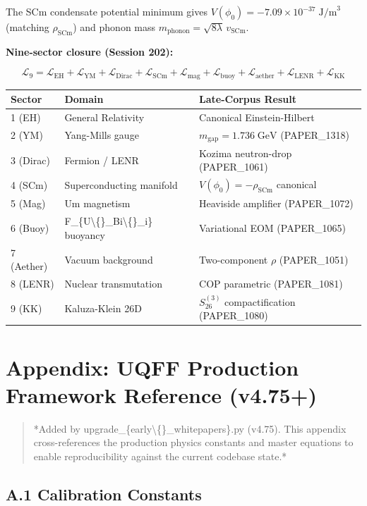 \documentclass[11pt]{article}
\begin{document}
The SCm condensate potential minimum gives $V(\phi_0) = -7.09 \times 10^{-37}\;\text{J/m}^3$ (matching $\rho_{\text{SCm}}$) and phonon mass $m_{\text{phonon}} = \sqrt{8\lambda}\,v_{\text{SCm}}$.

\textbf{Nine-sector closure (Session 202):}

$$\mathcal{L}_{9} = \mathcal{L}_{\text{EH}} + \mathcal{L}_{\text{YM}} + \mathcal{L}_{\text{Dirac}} + \mathcal{L}_{\text{SCm}} + \mathcal{L}_{\text{mag}} + \mathcal{L}_{\text{buoy}} + \mathcal{L}_{\text{aether}} + \mathcal{L}_{\text{LENR}} + \mathcal{L}_{\text{KK}}$$

\begin{center}
\begin{longtable}{lll}
\toprule
Sector & Domain & Late-Corpus Result \tabularnewline
\midrule
\endhead
1 (EH) & General Relativity & Canonical Einstein-Hilbert \tabularnewline
2 (YM) & Yang-Mills gauge & $m_{\text{gap}} = 1.736\;\text{GeV}$ (PAPER\_1318) \tabularnewline
3 (Dirac) & Fermion / LENR & Kozima neutron-drop (PAPER\_1061) \tabularnewline
4 (SCm) & Superconducting manifold & $V(\phi_0) = -\rho_{\text{SCm}}$ canonical \tabularnewline
5 (Mag) & Um magnetism & Heaviside amplifier (PAPER\_1072) \tabularnewline
6 (Buoy) & F\_\{U\textbackslash\{\}\_Bi\textbackslash\{\}\_i\} buoyancy & Variational EOM (PAPER\_1065) \tabularnewline
7 (Aether) & Vacuum background & Two-component $\rho$ (PAPER\_1051) \tabularnewline
8 (LENR) & Nuclear transmutation & COP parametric (PAPER\_1081) \tabularnewline
9 (KK) & Kaluza-Klein 26D & $S_{26}^{(3)}$ compactification (PAPER\_1080) \tabularnewline
\bottomrule
\end{longtable}
\end{center}

\section*{Appendix: UQFF Production Framework Reference (v4.75+)}

\begin{quote}
*Added by upgrade\_\{early\textbackslash\{\}\_whitepapers\}.py (v4.75). This appendix cross-references
the production physics constants and master equations to enable reproducibility
against the current codebase state.*
\end{quote}

\subsection*{A.1 Calibration Constants}
\end{document}

